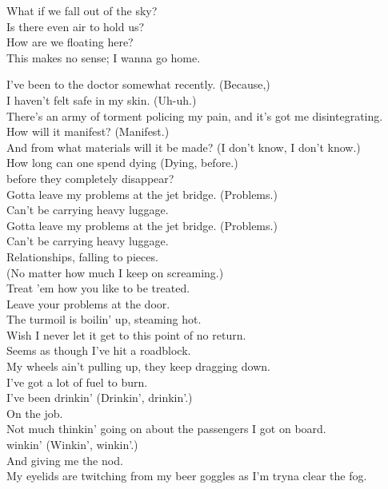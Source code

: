 What if we fall out of the sky? \\
Is there even air to hold us? \\
How are we floating here? \\
This makes no sense; I wanna go home. \\




I've been to the doctor somewhat recently. (Because,) \\
I haven't felt safe in my skin. (Uh-uh.) \\
There's an army of torment policing my pain, and it's got me disintegrating. \\
How will it manifest? (Manifest.) \\
And from what materials will it be made? (I don't know, I don't know.) \\
How long can one spend dying (Dying, before.) \\
before they completely disappear? \\

Gotta leave my problems at the jet bridge. (Problems.) \\
Can't be carrying heavy luggage. \\
Gotta leave my problems at the jet bridge. (Problems.) \\
Can't be carrying heavy luggage. \\
Relationships, falling to pieces. \\
(No matter how much I keep on screaming.) \\
Treat 'em how you like to be treated. \\
Leave your problems at the door. \\

The turmoil is boilin' up, steaming hot. \\
Wish I never let it get to this point of no return. \\
Seems as though I've hit a roadblock. \\
My wheels ain't pulling up, they keep dragging down. \\
I've got a lot of fuel to burn. \\
I've been drinkin' (Drinkin', drinkin'.) \\
On the job. \\
Not much thinkin' going on about the passengers I got on board. \\
 winkin' (Winkin', winkin'.) \\
And giving me the nod. \\
My eyelids are twitching from my beer goggles as I'm tryna clear the fog. \\

